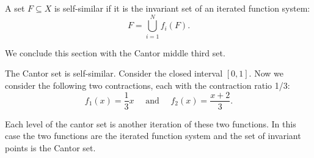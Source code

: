 \begin{definition}
    A set $F\subseteq X$ is self-similar if it is the invariant set of an iterated function system:
    $$F = \bigcup_{i=1}^N f_i(F).$$
\end{definition}
We conclude this section with the Cantor middle third set.  
\begin{example}
    The Cantor set is self-similar.  Consider the closed interval $[0,1]$.  Now we consider the following two contractions, each with the contraction ratio 1/3: 
    $$f_1 (x) = \frac{1}{3}x \quad \text{ and } \quad f_2 (x) = \frac{x+2}{3}.$$

    Each level of the cantor set is another iteration of these two functions.  In this case the two functions are the iterated function system and the set of invariant points is the Cantor set.  
\end{example}